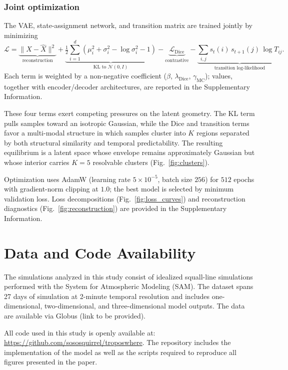 \documentclass[11pt]{article}
\begin{document}
\subsubsection{Joint optimization}

The VAE, state-assignment network, and transition matrix are trained jointly by minimizing
\[
\mathcal{L} =
\underbrace{\|X - \hat{X}\|^2}_{\text{reconstruction}}
+
\underbrace{\tfrac{1}{2}\sum_{i=1}^d \left(\mu_i^2 + \sigma_i^2 - \log \sigma_i^2 - 1\right)}_{\text{KL to } \mathcal{N}(0,I)}
-
\underbrace{\mathcal{L}_{\mathrm{Dice}}}_{\text{contrastive}}
-
\underbrace{\sum_{i,j} s_t(i)\, s_{t+1}(j)\, \log T_{ij}}_{\text{transition log-likelihood}}.
\]
Each term is weighted by a non-negative coefficient ($\beta$, $\lambda_{\mathrm{Dice}}$, $\gamma_{\mathrm{MC}}$); values, together with encoder/decoder architectures, are reported in the Supplementary Information.

These four terms exert competing pressures on the latent geometry. The KL term pulls samples toward an isotropic Gaussian, while the Dice and transition terms favor a multi-modal structure in which samples cluster into $K$ regions separated by both structural similarity and temporal predictability. The resulting equilibrium is a latent space whose envelope remains approximately Gaussian but whose interior carries $K=5$ resolvable clusters (Fig.~\ref{fig:clusters}).

Optimization uses AdamW (learning rate $5\times10^{-5}$, batch size $256$) for $512$ epochs with gradient-norm clipping at $1.0$; the best model is selected by minimum validation loss. Loss decompositions (Fig.~\ref{fig:loss_curves}) and reconstruction diagnostics (Fig.~\ref{fig:reconstruction}) are provided in the Supplementary Information.

\section{Data and Code Availability}

The simulations analyzed in this study consist of idealized squall-line simulations performed with the System for Atmospheric Modeling (SAM). The dataset spans 27 days of simulation at 2-minute temporal resolution and includes one-dimensional, two-dimensional, and three-dimensional model outputs. The data are available via Globus (link to be provided).

All code used in this study is openly available at: \url{https://github.com/sososquirrel/troposwhere}. The repository includes the implementation of the model as well as the scripts required to reproduce all figures presented in the paper.
\end{document}
